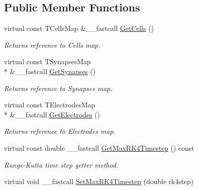 \subsection*{Public Member Functions}
\begin{DoxyCompactItemize}
\item 
\hypertarget{class_t_network_ad526c42cca14e656a0d84134d03231b6}{virtual const T\+Cells\+Map \&\+\_\+\+\_\+fastcall \hyperlink{class_t_network_ad526c42cca14e656a0d84134d03231b6}{Get\+Cells} ()}\label{class_t_network_ad526c42cca14e656a0d84134d03231b6}

\begin{DoxyCompactList}\small\item\em Returns reference to Cells map. \end{DoxyCompactList}\item 
\hypertarget{class_t_network_ad4e242b97eb3385e9fd24d9dc2885970}{virtual const T\+Synapses\+Map \\*
\&\+\_\+\+\_\+fastcall \hyperlink{class_t_network_ad4e242b97eb3385e9fd24d9dc2885970}{Get\+Synapses} ()}\label{class_t_network_ad4e242b97eb3385e9fd24d9dc2885970}

\begin{DoxyCompactList}\small\item\em Returns reference to Synapses map. \end{DoxyCompactList}\item 
\hypertarget{class_t_network_a18855029644af07d17bfcb7b39b8045b}{virtual const T\+Electrodes\+Map \\*
\&\+\_\+\+\_\+fastcall \hyperlink{class_t_network_a18855029644af07d17bfcb7b39b8045b}{Get\+Electrodes} ()}\label{class_t_network_a18855029644af07d17bfcb7b39b8045b}

\begin{DoxyCompactList}\small\item\em Returns reference to Electrodes map. \end{DoxyCompactList}\item 
\hypertarget{class_t_network_ae34128013b8bb9949c3f83c496894042}{virtual const double \+\_\+\+\_\+fastcall \hyperlink{class_t_network_ae34128013b8bb9949c3f83c496894042}{Get\+Max\+R\+K4\+Timestep} () const }\label{class_t_network_ae34128013b8bb9949c3f83c496894042}

\begin{DoxyCompactList}\small\item\em Runge-\/\+Kutta time step getter method. \end{DoxyCompactList}\item 
\hypertarget{class_t_network_ad76213030f30e7ad850cc0c37c84a2da}{virtual void \+\_\+\+\_\+fastcall \hyperlink{class_t_network_ad76213030f30e7ad850cc0c37c84a2da}{Set\+Max\+R\+K4\+Timestep} (double rk4step)}\label{class_t_network_ad76213030f30e7ad850cc0c37c84a2da}


\end{DoxyCompactItemize}
